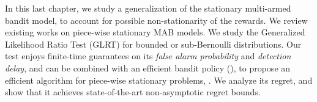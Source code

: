 \abstractStartChapter{}%
%
In this last chapter, we study a generalization of the stationary multi-armed bandit model,
to account for possible non-stationarity of the rewards.
%
We review existing works on piece-wise stationary MAB models.
%
We study the Generalized Likelihood Ratio Test (GLRT) for
bounded or sub-Bernoulli distributions.
Our test enjoys finite-time guarantees
%
on its \emph{false alarm probability} and \emph{detection delay}, and can be combined with an efficient bandit policy (\klUCB), to propose an efficient algorithm for piece-wise stationary problems, \GLRklUCB.
%
We analyze its regret, and show that it achieves state-of-the-art non-asymptotic regret bounds.
